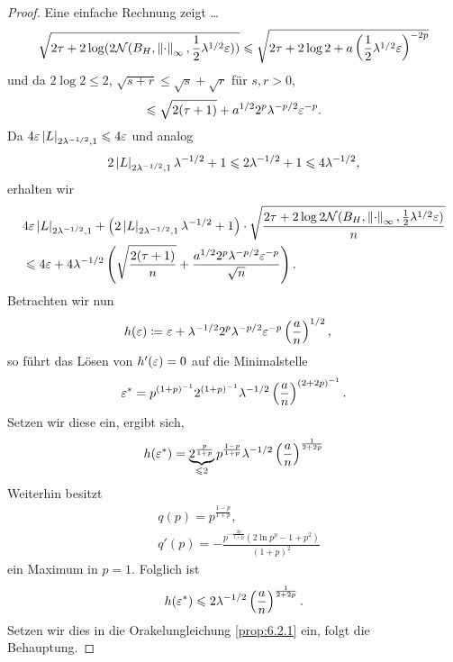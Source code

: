 \begin{proof}
Eine einfache Rechnung zeigt \ldots
\begin{align*}
\sqrt{2\tau + 2\log(2\mathcal{N}(B_H,\left\|\cdot\right\|_\infty, \frac{1}{2}\lambda^{1/2}\varepsilon))}
\leqslant
\sqrt{2\tau + 2\log 2 + a\left(\frac{1}{2}\lambda^{1/2}\varepsilon \right)^{-2p}}
\end{align*}
und da $2\log 2\le 2$, $\sqrt{s+r}\le \sqrt{s}+\sqrt{r}$ für $s,r>0$,
\begin{align*}
\leqslant \sqrt{2(\tau+1)} + a^{1/2}2^p\lambda^{-p/2}\varepsilon^{-p}.
\end{align*}
Da $4\varepsilon \left|L\right|_{2\lambda^{-1/2},1} \leqslant 4\varepsilon$ und analog
\begin{align*}
2\left|L\right|_{2\lambda^{-1/2},1}\lambda^{-1/2} + 1
\leqslant 2\lambda^{-1/2}+1
\leqslant 4\lambda^{-1/2},
\end{align*}
erhalten wir
\begin{align*}
&4\varepsilon \left|L\right|_{2\lambda^{-1/2},1} +
\left(2\left|L\right|_{2\lambda^{-1/2},1}\lambda^{-1/2} + 1 \right)
\cdot \sqrt{\frac{2\tau +2\log 2\mathcal{N}(B_H, \left\|\cdot\right\|_\infty,
\frac{1}{2}\lambda^{1/2}\varepsilon)}{n}}\\
&\leqslant 4\varepsilon + 4\lambda^{-1/2} \left( \sqrt{\frac{2(\tau+1)}{n}}
+ \frac{a^{1/2}2^p\lambda^{-p/2}\varepsilon^{-p}}{\sqrt{n}}\right).
\end{align*}
Betrachten wir nun
\begin{align*}
&h(\varepsilon) \coloneq \varepsilon + \lambda^{-1/2} 2^p \lambda^{-p/2}
\varepsilon^{-p}\left(\frac{a}{n}\right)^{1/2},
\end{align*}
so führt das Lösen von $h'(\varepsilon) = 0$ auf die Minimalstelle
\begin{align*}
\varepsilon^* = p^{(1+p)^{-1}} 2^{(1+p)^{-1}} \lambda^{-1/2}
\left(\frac{a}{n}\right)^{(2+2p)^{-1}}.
\end{align*}
Setzen wir diese ein, ergibt sich,
\begin{align*}
h(\varepsilon^*) = \underbrace{2^{\frac{p}{1+p}}}_{\leqslant 2}p^{\frac{1-p}{1+p}}
\lambda^{-1/2} \left(\frac{a}{n}\right)^{\frac{1}{2+2p}}
\end{align*}
Weiterhin besitzt
\begin{align*}
&q(p) = p^{\frac{1-p}{1+p}},\\
&q'(p) =
-\frac{p^{-\frac{2p}{1+p}}\left(2\ln p^p - 1 + p^2\right)}{(1+p)^2}
\end{align*}
ein Maximum in $p=1$. Folglich ist
\begin{align*}
h(\varepsilon^*) \leqslant 2 \lambda^{-1/2} \left(\frac{a}{n}\right)^{\frac{1}{2+2p}}.
\end{align*}
Setzen wir dies in die Orakelungleichung \ref{prop:6.2.1} ein, folgt die
Behauptung.\qedhere
\end{proof}

